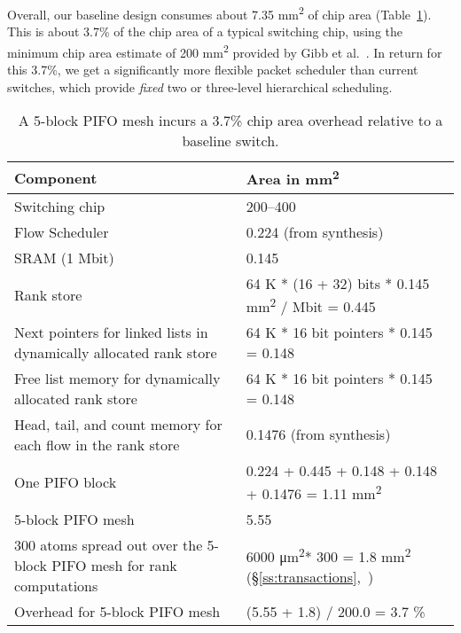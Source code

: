 Overall, our baseline design consumes about 7.35 \si{\milli\metre\squared} of
chip area (Table~\ref{tab:area_overheads}). This is about 3.7\% of the chip
area of a typical switching chip, using the minimum chip area estimate of 200
\si{\milli\metre\squared} provided by Gibb et al.~\cite{glen_parsing}. In
return for this 3.7\%, we get a significantly more flexible packet scheduler
than current switches, which provide {\em fixed} two or three-level
hierarchical scheduling. 
 
\begin{table}[!h]
  \begin{small}
  \begin{tabular}{|p{}|p{}|}
  \hline
  Component & Area in \si{\milli\metre\squared}\\
  \hline
  Switching chip & 200--400~\cite{glen_parsing} \\
  \hline
  Flow Scheduler & 0.224 (from synthesis) \\
  \hline
  SRAM (1 Mbit) & 0.145~\cite{sram_estimate} \\
  \hline
  Rank store & 64 K * (16 + 32) bits * 0.145 \si{\milli\metre\squared} / Mbit = 0.445 \\
  \hline
  Next pointers for linked lists in dynamically allocated rank store & 64 K * 16 bit pointers * 0.145 = 0.148 \\
  \hline
  Free list memory for dynamically allocated rank store & 64 K * 16 bit pointers * 0.145 = 0.148 \\
  \hline
  Head, tail, and count memory for each flow in the rank store & 0.1476 (from synthesis) \\
  \hline
  One PIFO block & 0.224 + 0.445 + 0.148 + 0.148 + 0.1476 = 1.11 \si{\milli\metre\squared} \\
  \hline
  5-block PIFO mesh & 5.55 \\
  \hline
  300 atoms spread out over the 5-block PIFO mesh for rank computations & 6000 \si{\micro\metre\squared}* 300 = 1.8 \si{\milli\metre\squared} (\S\ref{ss:transactions},~\cite{domino_sigcomm})\\
  \hline
  Overhead for 5-block PIFO mesh & (5.55 + 1.8) / 200.0 = 3.7 \% \\
  \hline
  \end{tabular}
\end{small}
\caption{A 5-block PIFO mesh incurs a 3.7\% chip area overhead relative to
a baseline switch.}
\label{tab:area_overheads}
\end{table}

